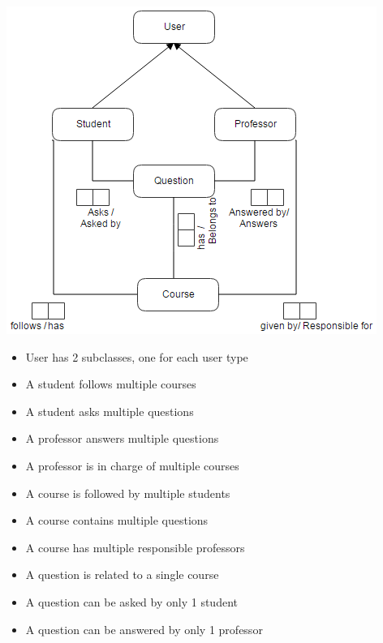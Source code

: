 \documentclass[10pt]{report}
\begin{document}
\begin{center}
	\includegraphics[scale=1]{img/orm.png}
\end{center}

\begin{itemize}
\item User has 2 subclasses, one for each user type
\item A student follows multiple courses
\item A student asks multiple questions
\item A professor answers multiple questions
\item A professor is in charge of multiple courses
\item A course is followed by multiple students
\item A course contains multiple questions
\item A course has multiple responsible professors
\item A question is related to a single course
\item A question can be asked by only 1 student
\item A question can be answered by only 1 professor

\end{itemize}
\end{document}
